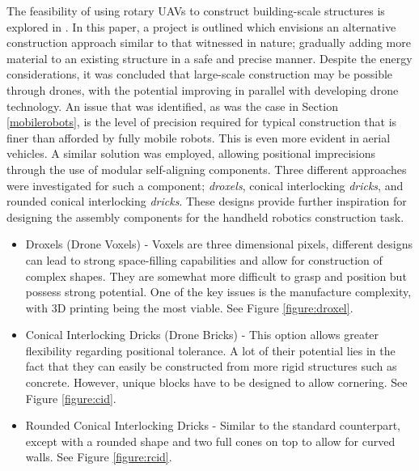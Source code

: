\documentclass[11pt]{article}
\begin{document}
The feasibility of using rotary UAVs to construct building-scale structures is explored in \cite{latteur2015}. In this paper, a project is outlined which envisions an alternative construction approach similar to that witnessed in nature; gradually adding more material to an existing structure in a safe and precise manner. Despite the energy considerations, it was concluded that large-scale construction may be possible through drones, with the potential improving in parallel with developing drone technology. An issue that was identified, as was the case in Section \ref{mobilerobots}, is the level of precision required for typical construction that is finer than afforded by fully mobile robots. This is even more evident in aerial vehicles. A similar solution was employed, allowing positional imprecisions through the use of modular self-aligning components. Three different approaches were investigated for such a component; \textit{droxels}, conical interlocking \textit{dricks}, and rounded conical interlocking \textit{dricks}. These designs provide further inspiration for designing the assembly components for the handheld robotics construction task.
\begin{itemize}
\item{Droxels (Drone Voxels) - Voxels are three dimensional pixels, different designs can lead to strong space-filling capabilities and allow for construction of complex shapes. They are somewhat more difficult to grasp and position but possess strong potential. One of the key issues is the manufacture complexity, with 3D printing being the most viable. See Figure \ref{figure:droxel}.}
\item{Conical Interlocking Dricks (Drone Bricks) - This option allows greater flexibility regarding positional tolerance. A lot of their potential lies in the fact that they can easily be constructed from more rigid structures such as concrete. However, unique blocks have to be designed to allow cornering. See Figure \ref{figure:cid}.}
\item{Rounded Conical Interlocking Dricks - Similar to the standard counterpart, except with a rounded shape and two full cones on top to allow for curved walls. See Figure \ref{figure:rcid}.}
\end{itemize}
\end{document}
